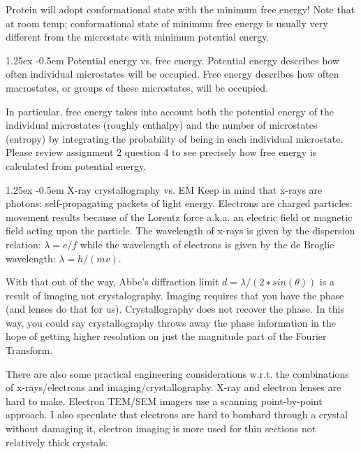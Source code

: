 \documentclass[8pt]{article}
\makeatletter
\newlength{\norm}
\newlength{\nrm}
\renewcommand{\paragraph}{%
  \@startsection{paragraph}{4}%
  {\z@}{1.25ex \@plus 2pt \@minus 2pt}{-0.5em}%
  {\fontsize{\f@size}{\nrm}\normalfont\bfseries}%
}
\makeatother
\begin{document}
Protein will adopt conformational state with the minimum free energy!   Note that at room temp; conformational state of minimum free energy is usually very different from the microstate with minimum potential energy.

\paragraph{Potential energy vs. free energy.} Potential energy describes how often individual microstates will be occupied. Free energy describes how often macrostates, or groups of these microstates, will be occupied.
 
In particular, free energy takes into account both the potential energy of the individual microstates (roughly enthalpy) and the number of microstates (entropy) by integrating the probability of being in each individual microstate. Please review assignment 2 question 4 to see precisely how free energy is calculated from potential energy.

\paragraph{X-ray crystallography vs. EM}
Keep in mind that x-rays are photons: self-propagating packets of light energy. Electrons are charged particles: movement results because of the Lorentz force a.k.a. an electric field or magnetic field acting upon the particle. The wavelength of x-rays is given by the dispersion relation: $\lambda = c/f$ while the wavelength of electrons is given by the de Broglie wavelength: $\lambda=h/(mv)$.
 
With that out of the way, Abbe's diffraction limit $d=\lambda / (2∗sin(\theta))$ is a result of imaging not crystalography. Imaging requires that you have the phase (and lenses do that for us). Crystallography does not recover the phase. In this way, you could say crystallography throws away the phase information in the hope of getting higher resolution on just the magnitude part of the Fourier Transform.
 
There are also some practical engineering considerations w.r.t. the combinations of x-rays/electrons and imaging/crystallography. X-ray and electron lenses are hard to make. Electron TEM/SEM imagers use a scanning point-by-point approach. I also speculate that electrons are hard to bombard through a crystal without damaging it, electron imaging is more used for thin sections not relatively thick crystals.
\end{document}
